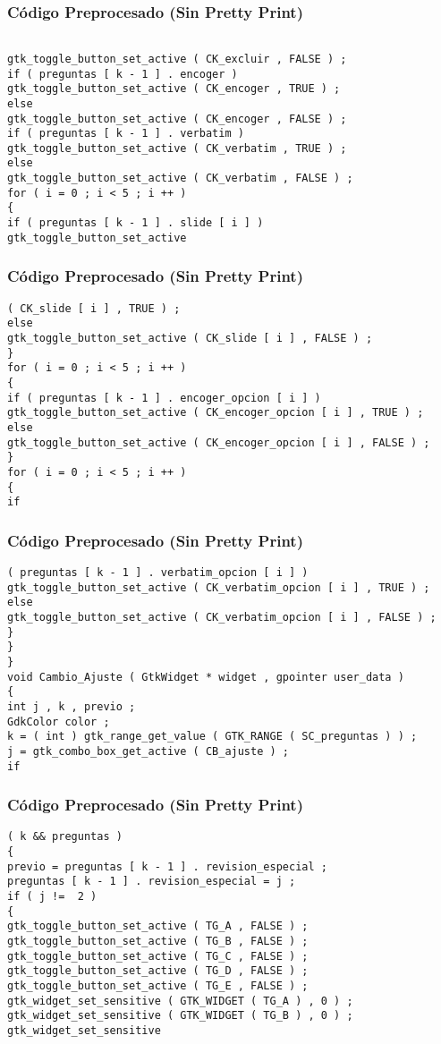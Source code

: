 \documentclass{beamer}
\begin{document}
\begin{frame}[fragile]
\frametitle{C\'odigo Preprocesado (Sin Pretty Print)}
\begin{lstlisting}[style=CStyle]

gtk_toggle_button_set_active ( CK_excluir , FALSE ) ; 
if ( preguntas [ k - 1 ] . encoger ) 
gtk_toggle_button_set_active ( CK_encoger , TRUE ) ; 
else 
gtk_toggle_button_set_active ( CK_encoger , FALSE ) ; 
if ( preguntas [ k - 1 ] . verbatim ) 
gtk_toggle_button_set_active ( CK_verbatim , TRUE ) ; 
else 
gtk_toggle_button_set_active ( CK_verbatim , FALSE ) ; 
for ( i = 0 ; i < 5 ; i ++ ) 
{ 
if ( preguntas [ k - 1 ] . slide [ i ] ) 
gtk_toggle_button_set_active \end{lstlisting}
\end{frame}
\begin{frame}[fragile]
\frametitle{C\'odigo Preprocesado (Sin Pretty Print)}
\begin{lstlisting}[style=CStyle]
( CK_slide [ i ] , TRUE ) ; 
else 
gtk_toggle_button_set_active ( CK_slide [ i ] , FALSE ) ; 
} 
for ( i = 0 ; i < 5 ; i ++ ) 
{ 
if ( preguntas [ k - 1 ] . encoger_opcion [ i ] ) 
gtk_toggle_button_set_active ( CK_encoger_opcion [ i ] , TRUE ) ; 
else 
gtk_toggle_button_set_active ( CK_encoger_opcion [ i ] , FALSE ) ; 
} 
for ( i = 0 ; i < 5 ; i ++ ) 
{ 
if \end{lstlisting}
\end{frame}
\begin{frame}[fragile]
\frametitle{C\'odigo Preprocesado (Sin Pretty Print)}
\begin{lstlisting}[style=CStyle]
( preguntas [ k - 1 ] . verbatim_opcion [ i ] ) 
gtk_toggle_button_set_active ( CK_verbatim_opcion [ i ] , TRUE ) ; 
else 
gtk_toggle_button_set_active ( CK_verbatim_opcion [ i ] , FALSE ) ; 
} 
} 
} 
void Cambio_Ajuste ( GtkWidget * widget , gpointer user_data ) 
{ 
int j , k , previo ; 
GdkColor color ; 
k = ( int ) gtk_range_get_value ( GTK_RANGE ( SC_preguntas ) ) ; 
j = gtk_combo_box_get_active ( CB_ajuste ) ; 
if \end{lstlisting}
\end{frame}
\begin{frame}[fragile]
\frametitle{C\'odigo Preprocesado (Sin Pretty Print)}
\begin{lstlisting}[style=CStyle]
( k && preguntas ) 
{ 
previo = preguntas [ k - 1 ] . revision_especial ; 
preguntas [ k - 1 ] . revision_especial = j ; 
if ( j !=  2 ) 
{ 
gtk_toggle_button_set_active ( TG_A , FALSE ) ; 
gtk_toggle_button_set_active ( TG_B , FALSE ) ; 
gtk_toggle_button_set_active ( TG_C , FALSE ) ; 
gtk_toggle_button_set_active ( TG_D , FALSE ) ; 
gtk_toggle_button_set_active ( TG_E , FALSE ) ; 
gtk_widget_set_sensitive ( GTK_WIDGET ( TG_A ) , 0 ) ; 
gtk_widget_set_sensitive ( GTK_WIDGET ( TG_B ) , 0 ) ; 
gtk_widget_set_sensitive \end{lstlisting}
\end{frame}
\end{document}
